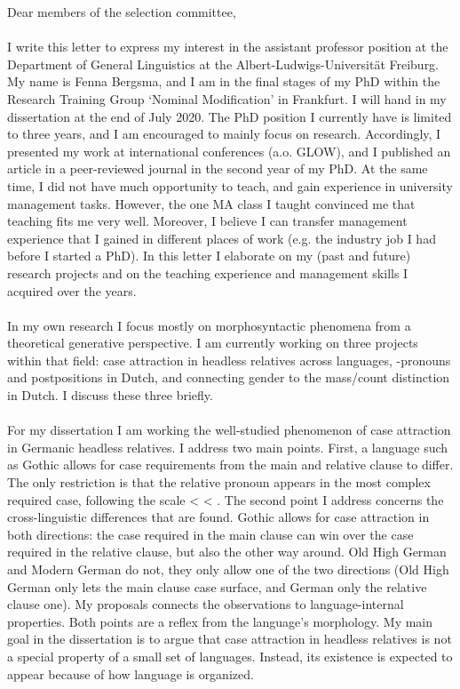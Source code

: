 \documentclass[12pt]{article}
\begin{document}
\raggedright

Dear members of the selection committee,\\

\phantom{x}\\

I write this letter to express my interest in the assistant professor position at the Department of General Linguistics at the Albert-Ludwigs-Universität Freiburg. My name is Fenna Bergsma, and I am in the final stages of my PhD within the Research Training Group `Nominal Modification' in Frankfurt. I will hand in my dissertation at the end of July 2020. The PhD position I currently have is limited to three years, and I am encouraged to mainly focus on research. Accordingly, I presented my work at international conferences (a.o. GLOW), and I published an article in a peer-reviewed journal in the second year of my PhD. At the same time, I did not have much opportunity to teach, and gain experience in university management tasks. However, the one MA class I taught convinced me that teaching fits me very well. Moreover, I believe I can transfer management experience that I gained in different places of work (e.g. the industry job I had before I started a PhD). In this letter I elaborate on my (past and future) research projects and on the teaching experience and management skills I acquired over the years.\\

\phantom{x}\\

In my own research I focus mostly on morphosyntactic phenomena from a theoretical generative perspective. I am currently working on three projects within that field: case attraction in headless relatives across languages, -pronouns and postpositions in Dutch, and connecting gender to the mass/count distinction in Dutch. I discuss these three briefly.\\

\phantom{x}\\

For my dissertation I am working the well-studied phenomenon of case attraction in Germanic headless relatives. I address two main points. First, a language such as Gothic allows for case requirements from the main and relative clause to differ. The only restriction is that the relative pronoun appears in the most complex required case, following the scale  <  < . The second point I address concerns the cross-linguistic differences that are found. Gothic allows for case attraction in both directions: the case required in the main clause can win over the case required in the relative clause, but also the other way around. Old High German and Modern German do not, they only allow one of the two directions (Old High German only lets the main clause case surface, and German only the relative clause one). My proposals connects the observations to language-internal properties. Both points are a reflex from the language’s morphology. My main goal in the dissertation is to argue that case attraction in headless relatives is not a special property of a small set of languages. Instead, its existence is expected to appear because of how language is organized.\\
\end{document}
